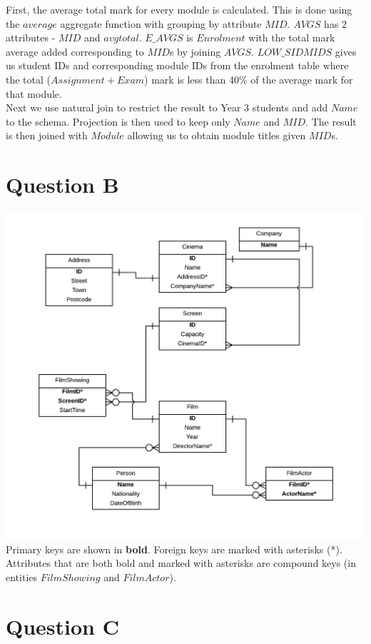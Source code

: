 \documentclass[a4paper]{article}
\begin{document}
\begin{enumerate}
        First, the average total mark for every module is calculated. This is done using the $average$
        aggregate function with grouping by attribute $MID$. $AVGS$ has 2 attributes - $MID$ and $avgtotal$.
        $E\_AVGS$ is $Enrolment$ with the total mark average added corresponding to $MID$s by joining $AVGS$.
        $ LOW\_SIDMIDS $ gives us student IDs and corresponding module IDs from the enrolment table where
        the total ($Assignment + Exam$) mark is less than 40\% of the average mark for that module.\\
        Next we use natural join to restrict the result to Year 3 students and add $Name$ to the schema. 
        Projection is then used to keep only $Name$ and $MID$. The result is then joined with $Module$ 
        allowing us to obtain module titles given $MID$s.
\end{enumerate}

\section*{Question B}
\includegraphics[scale=0.5]{erd}\newline
Primary keys are shown in \textbf{bold}. Foreign keys are marked with asterisks (*).
Attributes that are both bold and marked with asterisks are compound keys (in entities $FilmShowing$ and $FilmActor$).
\section*{Question C}

\end{document}
